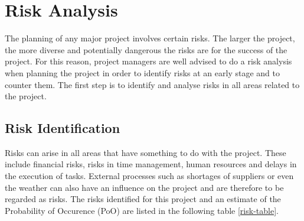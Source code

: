 \chapter{Risk Analysis}
The planning of any major project involves certain risks. The larger the project, the more diverse and potentially dangerous the risks are for the success of the project. For this reason, project managers are well advised to do a risk analysis when planning the project in order to identify risks at an early stage and to counter them. The first step is to identify and analyse risks in all areas related to the project.

\section{Risk Identification}
Risks can arise in all areas that have something to do with the project. These include financial risks, risks in time management, human resources and delays in the execution of tasks. External processes such as shortages of suppliers or even the weather can also have an influence on the project and are therefore to be regarded as risks. The risks identified for this project and an estimate of the Probability of Occurence (PoO) are listed in the following table \ref{risk-table}.

